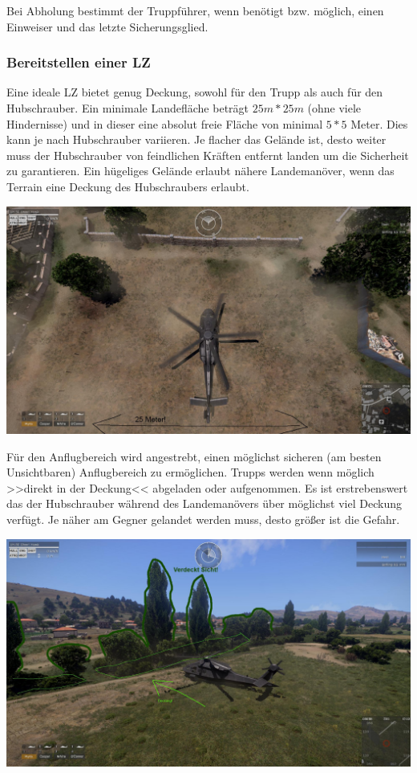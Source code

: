 	Bei Abholung bestimmt der Truppführer, wenn benötigt bzw. möglich, einen Einweiser und das letzte Sicherungsglied.

\subsubsection{Bereitstellen einer \acf{LZ}}
	Eine ideale \ac{LZ} bietet genug Deckung, sowohl für den Trupp als auch für den Hubschrauber. Ein minimale Landefläche beträgt $25m * 25m$ (ohne viele Hindernisse) und in dieser eine absolut freie Fläche von minimal $5 * 5$ Meter. Dies kann je nach Hubschrauber variieren. Je flacher das Gelände ist, desto weiter muss der Hubschrauber von feindlichen Kräften entfernt landen um die Sicherheit zu garantieren. Ein hügeliges Gelände erlaubt nähere Landemanöver, wenn das Terrain eine Deckung des Hubschraubers erlaubt. \\
	\begin{minipage}[t]{1\textwidth}
		\includegraphics[width=\textwidth]{./Grafiken/Hubschrauber/Landezone.jpg}
	\end{minipage}

	Für den Anflugbereich wird angestrebt, einen möglichst sicheren (am besten Unsichtbaren) Anflugbereich zu ermöglichen. Trupps werden wenn möglich >>direkt in der Deckung<< abgeladen oder aufgenommen. Es ist erstrebenswert das der Hubschrauber während des Landemanövers über möglichst viel Deckung verfügt. Je näher am Gegner gelandet werden muss, desto größer ist die Gefahr. \\
	\begin{minipage}[t]{1\textwidth}
		\includegraphics[width=\textwidth]{./Grafiken/Hubschrauber/verdeckteLandungamSammelpunktmitDeckung.jpg}
	\end{minipage}


